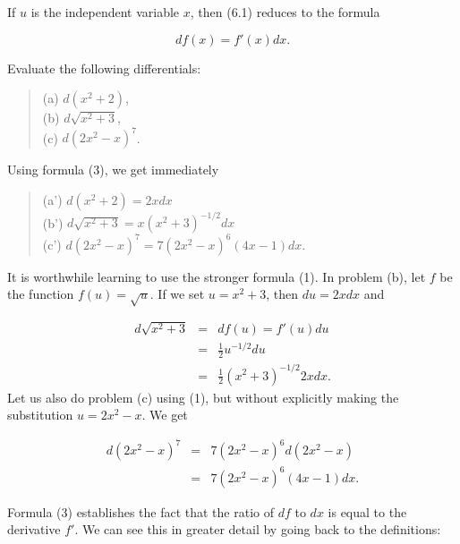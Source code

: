 If $u$ is the independent variable $x$, then (6.1) reduces to the formula

\begin{equation}
 df(x) = f'(x)dx. 
\label{eq2.6.3}
\end{equation}

\begin{example}
Evaluate the following differentials:

\begin{quote}
\begin{description}
\item[(a) $d(x^2 + 2)$,]
\item[(b) $d\sqrt{x^2 + 3}$, ]
\item[(c) $d(2x^2-x)^7$.] 
\end{description}
\end{quote}

\noindent Using formula (3), we get immediately 

\begin{quote}
\begin{description}
\item[(a') $d(x^2 + 2) = 2xdx$]
\item[(b') $d\sqrt{x^2 + 3} = x(x^2 + 3)^{-1/2} dx$]
\item[(c') $d(2x^2-x)^7 = 7(2x^2-x)^6(4x-1)dx$.]
\end{description}
\end{quote}

\noindent It is worthwhile learning to use the stronger formula (1). In problem (b), let $f$ be the function $f(u) = \sqrt{u}$. If we set $u = x^2 + 3$, then $du = 2x dx$ and

\begin{eqnarray*}
d\sqrt{x^2 + 3} &=& df(u) = f'(u) du\\
                        &=& \frac{1}{2}u^{-1/2}du\\
                        &=& \frac{1}{2}(x^2 + 3)^{-1/2}2x dx.
\end{eqnarray*}
\noindent Let us also do problem (c) using (1), but without explicitly making the substitution $u = 2x^2 - x$. We get

\begin{eqnarray*}
d(2x^2 - x)^7 &=& 7(2x^2 - x)^{6} d(2x^2 - x)\\
                     &=& 7(2x^2 - x)^{6} (4x - 1) dx.
\end{eqnarray*}

Formula (3) establishes the fact that the ratio of $df$ to $dx$ is equal to the derivative $f'$. We can see this in greater detail by going back to the definitions:


\end{example}
